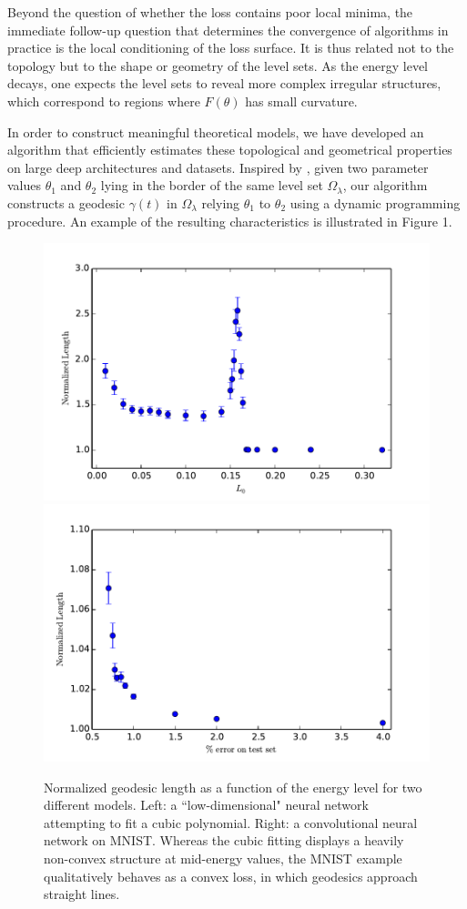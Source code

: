 \documentclass[10pt]{article}
\begin{document}
Beyond the question of whether the loss contains poor local minima, the immediate follow-up question that determines the convergence of algorithms in practice is the local conditioning of the loss surface. It is thus related not to the topology but to the shape or geometry of the level sets. As the energy level decays, one expects the level sets to reveal more complex irregular structures, which correspond to regions where $F(\theta)$ has small curvature.

In order to construct meaningful theoretical models, we have developed an algorithm \cite{danieljoan} that efficiently estimates these topological and geometrical properties on large deep architectures and datasets. Inspired by \cite{goodfellow2014qualitatively}, given two parameter values $\theta_1$ and $\theta_2$ lying in the border of the same level set $\Omega_\lambda$, our algorithm constructs a geodesic $\gamma(t)$ in $\Omega_\lambda$ relying $\theta_1$ to $\theta_2$ using a dynamic programming procedure. An example of the resulting characteristics is illustrated in Figure 1. 

\begin{figure}
\label{figurelength}
\centering
\includegraphics[width=.4\textwidth]{../Writeup/Plots/normlengthcubics}
\includegraphics[width=.4\textwidth]{../Writeup/Plots/normlengthMNIST}
\caption{Normalized geodesic length as a function of the energy level for two different models. Left: a ``low-dimensional" neural network 
attempting to fit a cubic polynomial. Right: a convolutional neural network on MNIST. Whereas the cubic fitting displays a heavily non-convex structure 
at mid-energy values, the MNIST example qualitatively behaves as a convex loss, in which geodesics approach straight lines.}
\end{figure}
\end{document}
